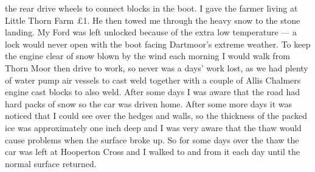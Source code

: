 the rear drive wheels to connect blocks in the boot. I gave the farmer living
at Little Thorn Farm £1. He then towed me through the heavy snow to the stone
landing. My Ford was left unlocked because of the extra low temperature --- a
lock would never open with the boot facing Dartmoor's extreme weather. To keep
the engine clear of snow blown by the wind each morning I would walk from Thorn
Moor then drive to work, so never was a days' work lost, as we had plenty of
water pump air vessels to cast weld together with a couple of Allis Chalmers
engine cast blocks to also weld. After some days I was aware that the road had
hard packs of snow so the car was driven home. After some more days it was
noticed that I could see over the hedges and walls, so the thickness of the
packed ice was approximately one inch deep and I was very aware that the thaw
would cause problems when the surface broke up. So for some days over the thaw
the car was left at Hooperton Cross and I walked to and from it each day until
the normal surface returned.

